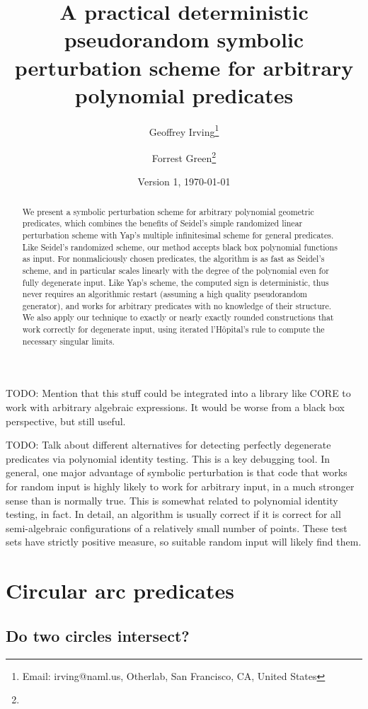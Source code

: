 \documentclass[11pt]{article}
\title{A practical deterministic pseudorandom symbolic perturbation scheme for arbitrary polynomial predicates}
\author{Geoffrey Irving\thanks{Email: irving@naml.us, Otherlab, San Francisco, CA, United States}
\and Forrest Green\thanks{\TODO}}
\date{Version 1, \today}
\newcommand{\TODO}{{\color{red} TODO}}
\begin{document}
\maketitle

\begin{abstract}
We present a symbolic perturbation scheme for arbitrary polynomial geometric predicates, which combines the benefits of
Seidel's simple randomized linear perturbation scheme with Yap's multiple infinitesimal scheme for general predicates.
Like Seidel's randomized scheme, our method accepts black box polynomial functions as input.
For nonmaliciously chosen predicates, the algorithm is as fast as Seidel's scheme, and in particular scales linearly
with the degree of the polynomial even for fully degenerate input.  Like Yap's scheme, the computed sign is deterministic,
thus never requires an algorithmic restart (assuming a high quality pseudorandom generator), and works for arbitrary
predicates with no knowledge of their structure.  We also apply our technique to exactly or nearly exactly rounded
constructions that work correctly for degenerate input, using iterated l'H\^opital's rule to compute the necessary
singular limits.
\end{abstract}

\TODO: Mention that this stuff could be integrated into a library like CORE to work with arbitrary algebraic expressions.
It would be worse from a black box perspective, but still useful.

\TODO: Talk about different alternatives for detecting perfectly degenerate predicates via polynomial identity testing.  This is a key debugging tool.  In general, one major advantage of symbolic perturbation is that code that works for random input is highly likely to work for arbitrary input, in a much stronger sense than is normally true.  This is somewhat related to polynomial identity testing, in fact.
In detail, an algorithm is usually correct if it is correct for all semi-algebraic configurations of a relatively small number of points.  These test sets have strictly positive measure, so suitable random input will likely find them.

\section{Circular arc predicates}

\subsection{Do two circles intersect?}
\end{document}
